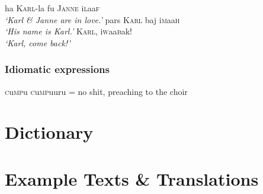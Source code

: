 \documentclass[a4paper,10pt,twoside,openright]{memoir}
\newcommand{\famwordold}[5]{#1\textsc{#2}#3\textsc{#4}#5}
\begin{document}
\pex
\a
ha \textsc{Karl}-la fu \textsc{Janne} \famwordold{i}{l}{aa}{f}{}\\
\textit{`Karl \& Janne are in love.'}
\a
pars \textsc{Karl} baj \famwordold{i}{m}{aa}{h}{}\\
\textit{`His name is Karl.'}
\a
\textsc{Karl}, \famwordold{i}{w}{aa}{b}{ak}!\\
\textit{`Karl, come back!'}
\xe


\section{Idiomatic expressions}

\famwordold{}{c}{u}{mp}{u} \famwordold{}{c}{u}{mp}{uuru} = no shit, preaching to the choir

\part{Dictionary}



\part{Example Texts \& Translations}


\end{document}
